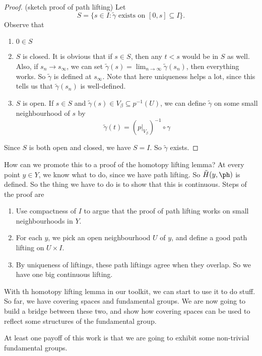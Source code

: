 \documentclass[a4paper]{article}
\begin{document}
\begin{proof}(sketch proof of path lifting)
  Let
  \[
    S = \{s \in I: \tilde{\gamma}\text{ exists on }[0, s] \subseteq I\}.
  \]
  Observe that
  \begin{enumerate}
    \item $0\in S$
    \item $S$ is closed. It is obvious that if $s \in S$, then any $t < s$ would be in $S$ as well. Also, if $s_n \to s_{\infty}$, we can set $\tilde{\gamma}(s) = \lim_{n \to \infty}\tilde{\gamma}(s_n)$, then everything works. So $\tilde{\gamma}$ is defined at $s_{\infty}$. Note that here uniqueness helps a lot, since this tells us that $\tilde{\gamma}(s_n)$ is well-defined.

    \item $S$ is open. If $s\in S$ and $\tilde{\gamma}(s) \in V_\beta \subseteq p^{-1}(U)$, we can define $\tilde{\gamma}$ on some small neighbourhood of $s$ by
      \[
        \tilde{\gamma}(t) = (p|_{V_\beta})^{-1}\circ \gamma
      \]
  \end{enumerate}
  Since $S$ is both open and closed, we have $S = I$. So $\tilde{\gamma}$ exists.
\end{proof}
How can we promote this to a proof of the homotopy lifting lemma? At every point $y\in Y$, we know what to do, since we have path lifting. So $\tilde{H}(y, \ph)$ is defined. So the thing we have to do is to show that this is continuous. Steps of the proof are
\begin{enumerate}
  \item Use compactness of $I$ to argue that the proof of path lifting works on small neighbourhoods in $Y$.
  \item For each $y$, we pick an open neighbourhood $U$ of $y$, and define a good path lifting on $U\times I$.
  \item By uniqueness of liftings, these path liftings agree when they overlap. So we have one big continuous lifting.
\end{enumerate}

With th homotopy lifting lemma in our toolkit, we can start to use it to do stuff. So far, we have covering spaces and fundamental groups. We are now going to build a bridge between these two, and show how covering spaces can be used to reflect some structures of the fundamental group.

At least one payoff of this work is that we are going to exhibit some non-trivial fundamental groups.
\end{document}
